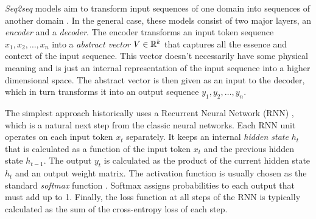 
\emph{Seq2seq} models aim to transform input sequences of one domain into
sequences of another domain \citep{Sutskever_2014}. In the general case, these
models consist of two major layers, an \emph{encoder} and a \emph{decoder}. The
encoder transforms an input token sequence $x_1, x_2, \dots, x_n$ into a
\emph{abstract vector} $V \in \mathbb{R}^k$ that captures all the essence and context of
the input sequence. This vector doesn't necessarily have some physical meaning
and is just an internal representation of the input sequence into a higher
dimensional space. The abstract vector is then given as an input to the decoder,
which in turn transforms it into an output sequence $y_1, y_2, \dots, y_n$.


The simplest approach historically uses a Recurrent Neural Network (RNN)
\citep{Rumelhart1986, Werbos1990}, which is a natural next step from the classic
neural networks. Each RNN unit operates on each input token $x_t$ separately. It
keeps an internal \emph{hidden state} $h_t$ that is calculated as
a function of the input token $x_t$ and the previous hidden state $h_{t-1}$.
The output $y_t$ is calculated as
the product of the current hidden state $h_t$ and an output weight matrix. The
activation function is usually chosen as the standard \emph{softmax} function
\citep{Goodfellow-et-al-2016, Bishop-book-2006}. Softmax assigns probabilities
to each output that must add up to 1.
Finally, the loss function at all steps of the RNN is typically calculated as
the sum of the cross-entropy loss of each step.

